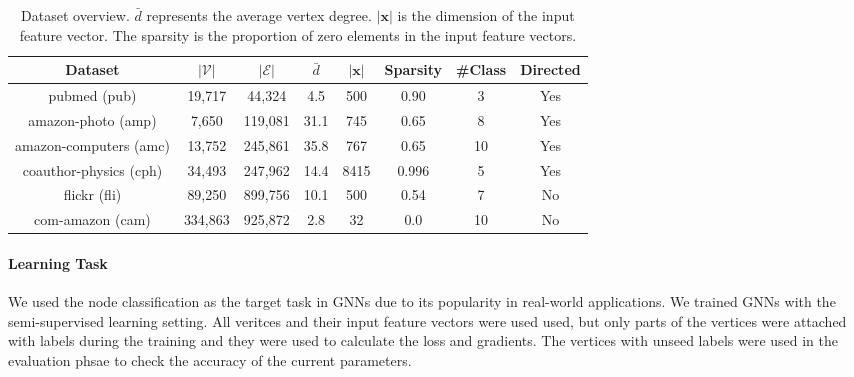\begin{table}
    \centering
    \small
    \begin{tabular}{cccccccc}
        \toprule
        Dataset                                                 & $|\mathcal{V}|$ & $|\mathcal{E}|$ & $\bar{d}$ & $|\boldsymbol{x}|$ & Sparsity & \#Class & Directed \\
        \midrule
        pubmed (pub) \cite{yang2016_revisiting_semisupervised}  & 19,717          & 44,324          & 4.5       & 500                & 0.90     & 3       & Yes      \\
        amazon-photo (amp) \cite{shchur2018_pitfall_of_gnn}     & 7,650           & 119,081         & 31.1      & 745                & 0.65     & 8       & Yes      \\
        amazon-computers (amc) \cite{shchur2018_pitfall_of_gnn} & 13,752          & 245,861         & 35.8      & 767                & 0.65     & 10      & Yes      \\
        coauthor-physics (cph) \cite{shchur2018_pitfall_of_gnn} & 34,493          & 247,962         & 14.4      & 8415               & 0.996    & 5       & Yes      \\
        flickr (fli) \cite{zeng2020_graphsaint}                 & 89,250          & 899,756         & 10.1      & 500                & 0.54     & 7       & No       \\
        com-amazon (cam) \cite{ang2012_defining}                & 334,863         & 925,872         & 2.8       & 32                 & 0.0      & 10      & No       \\
        \bottomrule
    \end{tabular}
    \caption{Dataset overview. $\bar{d}$ represents the average vertex degree. $|\boldsymbol{x}|$ is the dimension of the input feature vector. The sparsity is the proportion of zero elements in the input feature vectors.}
    \label{tab:dataset_overview}
\end{table}

\paragraph{Learning Task}
We used the node classification as the target task in GNNs due to its popularity in real-world applications.
We trained GNNs with the semi-supervised learning setting.
All veritces and their input feature vectors were used used, but only parts of the vertices were attached with labels during the training and they were used to calculate the loss and gradients.
The vertices with unseed labels were used in the evaluation phsae to check the accuracy of the current parameters.

